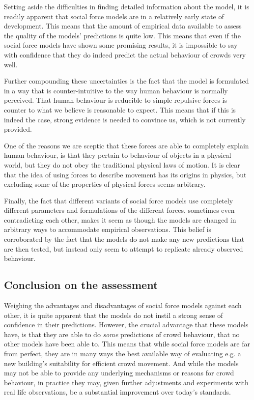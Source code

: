 Setting aside the difficulties in finding detailed information about the 
model, it is readily apparent that social force models are in a relatively 
early state of development. This means that the amount of empirical data 
available to assess the quality of the models' predictions is quite low. This 
means that even if the social force models have shown some promising results, 
it is impossible to say with confidence that they do indeed predict the actual 
behaviour of crowds very well.

Further compounding these uncertainties is the fact that the model is 
formulated in a way that is counter-intuitive to the way human behaviour is 
normally perceived. That human behaviour is reducible to simple repulsive 
forces is counter to what we believe is reasonable to expect. This means that 
if this is indeed the case, strong evidence is needed to convince us, which is 
not currently provided.

One of the reasons we are sceptic that these forces are able to completely 
explain human behaviour, is that they pertain to behaviour of objects in a 
physical world, but they do not obey the traditional physical laws of motion.  
It is clear that the idea of using forces to describe movement has its origins 
in physics, but excluding some of the properties of physical forces seems 
arbitrary.

Finally, the fact that different variants of social force models use 
completely different parameters and formulations of the different forces, 
sometimes even contradicting each other, makes it seem as though the models 
are changed in arbitrary ways to accommodate empirical observations. This 
belief is corroborated by the fact that the models do not make any new 
predictions that are then tested, but instead only seem to attempt to 
replicate already observed behaviour.

\subsection{Conclusion on the assessment}
Weighing the advantages and disadvantages of social force models against each 
other, it is quite apparent that the models do not instil a strong sense of 
confidence in their predictions. However, the crucial advantage that these 
models have, is that they are able to do \emph{some} predictions of crowd 
behaviour, that no other models have been able to. This means that while 
social force models are far from perfect, they are in many ways the best 
available way of evaluating e.g. a new building's suitability for efficient 
crowd movement. And while the models may not be able to provide any underlying 
mechanisms or reasons for crowd behaviour, in practice they may, given further 
adjustments and experiments with real life observations, be a substantial 
improvement over today's standards.
